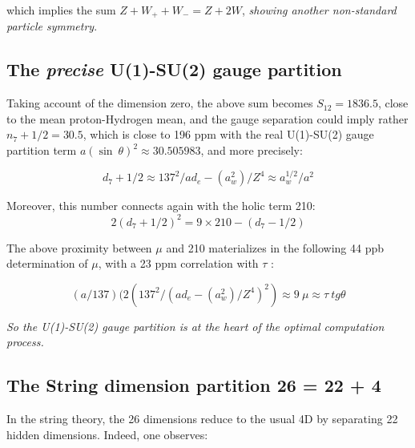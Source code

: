 \documentclass[a4paper,9pt]{article}
\begin{document}
which implies the sum $Z + W_+ + W_- = Z + 2W$, \textit{showing another non-standard particle symmetry}.



 \subsection{The \textit{precise} U(1)-SU(2) gauge partition}
 Taking account of the dimension zero, the above sum becomes $S_{12} = 1836.5$, close to the mean proton-Hydrogen mean, and the gauge separation could imply rather $n_7+1/2 = 30.5$, which is close to 196 ppm with the real U(1)-SU(2) gauge partition term $a (\sin~\theta)^2\approx 30.505983$, and more precisely:
 
 \begin{equation}\label{Eq39}
 d_7+1/2 \approx 137^2/ad_e -(a_w^2)/Z^4 \approx a_w^{1/2}/a^2
 \end{equation}
 
Moreover, this number connects again with the holic term 210:
% 
 \begin{equation}\label{Eq40}
 2(d_7+1/2)^2 = 9\times210 - (d_7-1/2)
 \end{equation}
 
 The above proximity between $\mu$ and 210 materializes in the following 44 ppb determination of $\mu$, with a 23 ppm correlation with $\tau$ : 
 
 \begin{equation}\label{Eq41}
 (a/137)(2(137^2/(ad_e -(a_w^2)/Z^4)^2) \approx 9~\mu \approx \tau~ tg \theta
 \end{equation}
 
 \textit{So the U(1)-SU(2) gauge partition is at the heart of the optimal computation process.}
 
 
 
 
 \subsection{The String dimension partition 26 = 22 + 4}
In the string theory, the 26 dimensions reduce to the usual 4D by separating 22 hidden dimensions. Indeed, one observes:
\end{document}
